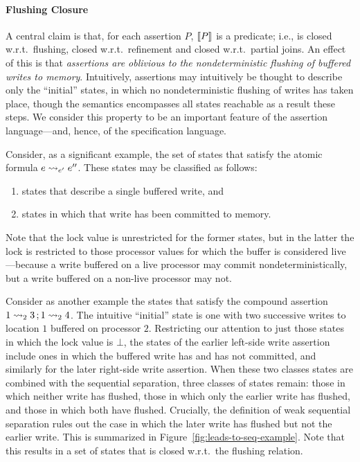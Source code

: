 \documentclass[11pt]{article}
\begin{document}
\paragraph{Flushing Closure}A central claim is that, for each assertion $P$, $[\![P]\!]$ is a predicate; i.e., is closed w.r.t.~flushing, closed w.r.t.~refinement and closed w.r.t.~partial joins. An effect of this is that \emph{assertions are oblivious to the nondeterministic flushing of buffered writes to memory}. Intuitively, assertions may intuitively be thought to describe only the ``initial'' states, in which no nondeterministic flushing of writes has taken place, though the semantics encompasses all states reachable as a result these steps. We consider this property to be an important feature of the assertion language---and, hence, of the specification language. 

Consider, as a significant example, the set of states that satisfy the atomic formula $e \leadsto_{e'} e''$. These states may be classified as follows: \begin{enumerate}
	\item states that describe a single buffered write, and 
	\item states in which that write has been committed to memory. 
\end{enumerate} Note that the lock value is unrestricted for the former states, but in the latter the lock is restricted to those processor values for which the buffer is considered live---because a write buffered on a live processor may commit nondeterministically, but a write buffered on a non-live processor may not. 

Consider as another example the states that satisfy the compound assertion $1 \leadsto_{2} 3 \operatorname{;} 1 \leadsto_{2} 4$. The intuitive ``initial'' state is one with two successive writes to location $1$ buffered on processor $2$. Restricting our attention to just those states in which the lock value is $\bot$, the states of the earlier left-side write assertion include ones in which the buffered write has and has not committed, and similarly for the later right-side write assertion. When these two classes states are combined with the sequential separation, three classes of states remain: those in which neither write has flushed, those in which only the earlier write has flushed, and those in which both have flushed. Crucially, the definition of weak sequential separation rules out the case in which the later write has flushed but not the earlier write. This is summarized in Figure~\ref{fig:leads-to-seq-example}. Note that this results in a set of states that is closed w.r.t.~the flushing relation. 
 
\end{document}
